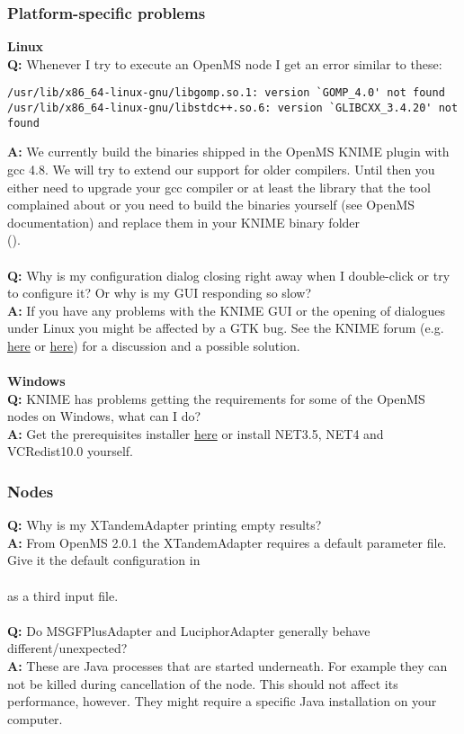 \subsubsection{Platform-specific problems}
\textbf{Linux}\\
\textbf{Q:} Whenever I try to execute an OpenMS node I get an error similar to these:
\begin{verbatim}
/usr/lib/x86_64-linux-gnu/libgomp.so.1: version `GOMP_4.0' not found
/usr/lib/x86_64-linux-gnu/libstdc++.so.6: version `GLIBCXX_3.4.20' not found
\end{verbatim}
\textbf{A:} We currently build the binaries shipped in the OpenMS KNIME plugin with gcc 4.8. We will try to extend our support for older compilers.
Until then you either need to upgrade your gcc compiler
or at least the library that the tool complained about or you need to build the
binaries yourself (see OpenMS documentation) and replace them in your KNIME binary folder\\
().
\\\\
\textbf{Q:} Why is my configuration dialog closing right away when I double-click or try to configure it? Or why is my GUI responding so slow?\\
\textbf{A:} If you have any problems with the KNIME GUI or the opening of dialogues under Linux you might be affected by a
GTK bug. See the KNIME forum (e.g. \href{https://tech.knime.org/forum/knime-general/ubuntu-1604-slow-performance}{here} or \href{https://tech.knime.org/forum/knime-users/knime-300-crashes-after-splash-screen}{here}) for a discussion and a possible solution.\\\\
\textbf{Windows}\\
\textbf{Q:} KNIME has problems getting the requirements for some of the OpenMS nodes on Windows, what can I do?\\
\textbf{A:} Get the prerequisites installer \href{\WindowsPrerequisitesLink}{here} or install NET3.5, NET4 and VCRedist10.0 yourself.\\
\subsubsection{Nodes}
\textbf{Q:} Why is my XTandemAdapter printing empty results?\\
\textbf{A:} From OpenMS 2.0.1 the XTandemAdapter requires a default parameter file. Give it the default configuration in\\
\\
 as a third input file.
\\\\
\textbf{Q:} Do MSGFPlusAdapter and LuciphorAdapter generally behave different/unexpected?\\
\textbf{A:} These are Java processes that are started underneath. For example they can not be killed during cancellation of the node.
This should not affect its performance, however. They might require a specific Java installation on your computer.
